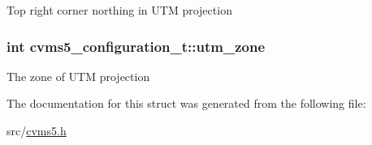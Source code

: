 Top right corner northing in U\+T\+M projection \hypertarget{structcvms5__configuration__t_aad2dc7f494a213abbc4f173a498cffbf}{
\subsubsection[{utm\+\_\+zone}]{\setlength{\rightskip}{0pt plus 5cm}int cvms5\+\_\+configuration\+\_\+t\+::utm\+\_\+zone}}\label{structcvms5__configuration__t_aad2dc7f494a213abbc4f173a498cffbf}
The zone of U\+T\+M projection 

The documentation for this struct was generated from the following file\+:\begin{DoxyCompactItemize}
\item 
src/\hyperlink{cvms5_8h}{cvms5.\+h}\end{DoxyCompactItemize}
